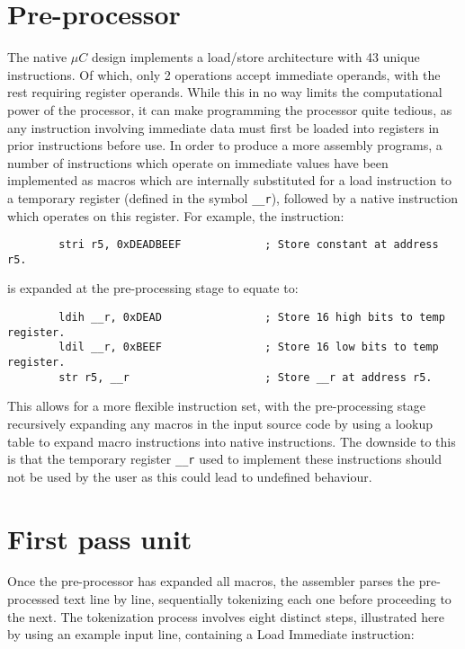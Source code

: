 \documentclass[12pt,twoside]{report}
\begin{document}
\section{Pre-processor}

The native $\mu C$ design implements a load/store architecture with 43
unique instructions. Of which, only 2 operations accept immediate
operands, with the rest requiring register operands. While this in no
way limits the computational power of the processor, it can make
programming the processor quite tedious, as any instruction involving
immediate data must first be loaded into registers in prior
instructions before use. In order to produce a more assembly programs,
a number of instructions which operate on immediate values have been
implemented as macros which are internally substituted for a load
instruction to a temporary register (defined in the symbol
\texttt{\_\_r}), followed by a native instruction which operates on
this register. For example, the instruction:

\begin{verbatim}
        stri r5, 0xDEADBEEF             ; Store constant at address r5.
\end{verbatim}

is expanded at the pre-processing stage to equate to:

\begin{verbatim}
        ldih __r, 0xDEAD                ; Store 16 high bits to temp register.
        ldil __r, 0xBEEF                ; Store 16 low bits to temp register.
        str r5, __r                     ; Store __r at address r5.
\end{verbatim}

This allows for a more flexible instruction set, with the
pre-processing stage recursively expanding any macros in the input
source code by using a lookup table to expand macro instructions into
native instructions. The downside to this is that the temporary
register \texttt{\_\_r} used to implement these instructions should
not be used by the user as this could lead to undefined behaviour.

\section{First pass unit}

Once the pre-processor has expanded all macros, the assembler parses
the pre-processed text line by line, sequentially tokenizing each one
before proceeding to the next. The tokenization process involves eight
distinct steps, illustrated here by using an example input line,
containing a Load Immediate instruction:
\end{document}
